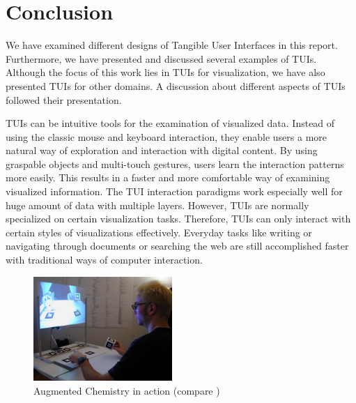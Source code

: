 \section{Conclusion}
We have examined different designs of Tangible User Interfaces in this report. Furthermore, we have presented and discussed several examples of TUIs. Although the focus of this work lies in TUIs for visualization, we have also presented TUIs for other domains. A discussion about different aspects of TUIs followed their presentation. 

TUIs can be intuitive tools for the examination of visualized data. Instead of using the classic mouse and keyboard interaction, they enable users a more natural way of exploration and interaction with digital content. By using graspable objects and multi-touch gestures, users learn the interaction patterns more easily. This results in a faster and more comfortable way of examining visualized information. The TUI interaction paradigms work especially well for huge amount of data with multiple layers. However, TUIs are normally specialized on certain visualization tasks. Therefore, TUIs can only interact with certain styles of visualizations effectively. Everyday tasks like writing or navigating through documents or searching the web are still accomplished faster with traditional ways of computer interaction.

\begin{figure}
\centering
\includegraphics[width=0.47\textwidth]{figures/augmented_chemistry.jpg}
\caption{Augmented Chemistry in action (compare \protect\cite{fjeld02})}
\label{fig:augmented_chemistry}
\end{figure}